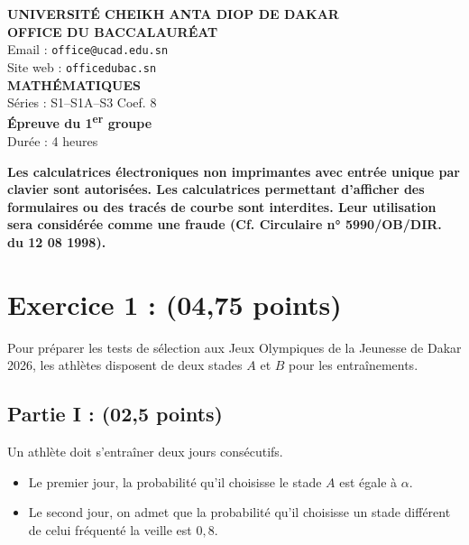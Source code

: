 \documentclass[11pt]{article}
\begin{document}
\begin{center}
    \textbf{UNIVERSITÉ CHEIKH ANTA DIOP DE DAKAR} \\
    \textbf{OFFICE DU BACCALAURÉAT} \\
    Email : \texttt{office@ucad.edu.sn} \\
    Site web : \texttt{officedubac.sn} \\
    \vspace{0.3cm}
    \textbf{\LARGE MATHÉMATIQUES} \\
    Séries : S1–S1A–S3 \hfill Coef. 8 \\
    \textbf{Épreuve du 1\textsuperscript{er} groupe} \\
    Durée : 4 heures
\end{center}

\vspace{0.2cm}
\noindent
\textbf{Les calculatrices électroniques non imprimantes avec entrée unique par clavier sont autorisées. Les calculatrices permettant d’afficher des formulaires ou des tracés de courbe sont interdites. Leur utilisation sera considérée comme une fraude (Cf. Circulaire n° 5990/OB/DIR. du 12 08 1998).}

\vspace{0.5cm}
\noindent
\section*{Exercice 1 :  (04,75 points)}

\vspace{0.2cm}
\noindent
Pour préparer les tests de sélection aux Jeux Olympiques de la Jeunesse de Dakar 2026, les athlètes disposent de deux stades \( A \) et \( B \) pour les entraînements.

\vspace{0.3cm}
\noindent
\subsection*{Partie I :  (02,5 points)}

\vspace{0.2cm}
\noindent
Un athlète doit s’entraîner deux jours consécutifs.

\begin{itemize}
    \item Le premier jour, la probabilité qu’il choisisse le stade \( A \) est égale à \( \alpha \).
    \item Le second jour, on admet que la probabilité qu’il choisisse un stade différent de celui fréquenté la veille est \( 0{,}8 \).
\end{itemize}
\end{document}
